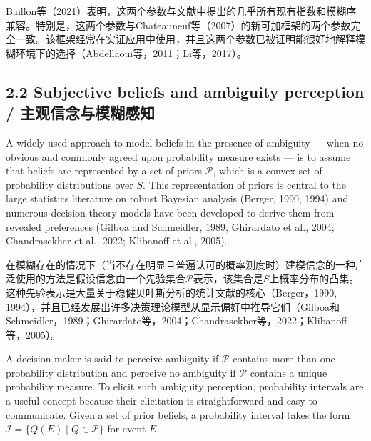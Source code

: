 \documentclass[12pt,a4paper]{article}
\newenvironment{original}
  {\par\medskip\noindent\color{black}\ignorespaces}
  {\par\medskip}
\newenvironment{translation}
  {\par\noindent\color{transblue}\ignorespaces}
  {\par\medskip\medskip}
\begin{document}
\begin{translation}
Baillon等（2021）表明，这两个参数与文献中提出的几乎所有现有指数和模糊序兼容。特别是，这两个参数与Chateauneuf等（2007）的新可加框架的两个参数完全一致。该框架经常在实证应用中使用，并且这两个参数已被证明能很好地解释模糊环境下的选择（Abdellaoui等，2011；Li等，2017）。
\end{translation}

\subsection{2.2 Subjective beliefs and ambiguity perception / 主观信念与模糊感知}

\begin{original}
A widely used approach to model beliefs in the presence of ambiguity --- when no obvious and commonly agreed upon probability measure exists --- is to assume that beliefs are represented by a set of priors $\mathcal{P}$, which is a convex set of probability distributions over $S$. This representation of priors is central to the large statistics literature on robust Bayesian analysis (Berger, 1990, 1994) and numerous decision theory models have been developed to derive them from revealed preferences (Gilboa and Schmeidler, 1989; Ghirardato et al., 2004; Chandrasekher et al., 2022; Klibanoff et al., 2005).
\end{original}

\begin{translation}
在模糊存在的情况下（当不存在明显且普遍认可的概率测度时）建模信念的一种广泛使用的方法是假设信念由一个先验集合$\mathcal{P}$表示，该集合是$S$上概率分布的凸集。这种先验表示是大量关于稳健贝叶斯分析的统计文献的核心（Berger，1990, 1994），并且已经发展出许多决策理论模型从显示偏好中推导它们（Gilboa和Schmeidler，1989；Ghirardato等，2004；Chandrasekher等，2022；Klibanoff等，2005）。
\end{translation}

\begin{original}
A decision-maker is said to perceive ambiguity if $\mathcal{P}$ contains more than one probability distribution and perceive no ambiguity if $\mathcal{P}$ contains a unique probability measure. To elicit such ambiguity perception, probability intervals are a useful concept because their elicitation is straightforward and easy to communicate. Given a set of prior beliefs, a probability interval takes the form $\mathcal{I} = \{Q(E) \mid Q \in \mathcal{P}\}$ for event $E$.
\end{original}
\end{document}
